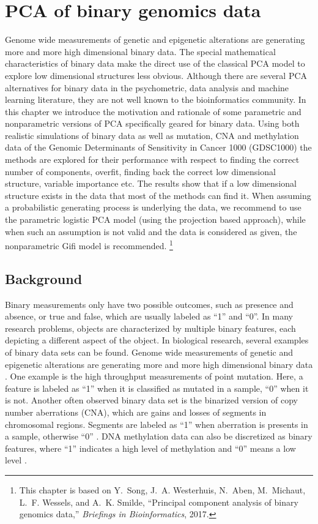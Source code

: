 \chapter{PCA of binary genomics data} \label{chapter:2}
Genome wide measurements of genetic and epigenetic alterations are generating more and more high dimensional binary data. The special mathematical characteristics of binary data make the direct use of the classical PCA model to explore low dimensional structures less obvious. Although there are several PCA alternatives for binary data in the psychometric, data analysis and machine learning literature, they are not well known to the bioinformatics community. In this chapter we introduce the motivation and rationale of some parametric and nonparametric versions of PCA specifically geared for binary data. Using both realistic simulations of binary data as well as mutation, CNA and methylation data of the Genomic Determinants of Sensitivity in Cancer 1000 (GDSC1000) the methods are explored for their performance with respect to finding the correct number of components, overfit, finding back the correct low dimensional structure, variable importance etc. The results show that if a low dimensional structure exists in the data that most of the methods can find it. When assuming a probabilistic generating process is underlying the data, we recommend to use the parametric logistic PCA model (using the projection based approach), while when such an assumption is not valid and the data is considered as given, the nonparametric Gifi model is recommended.
\footnote{This chapter is based on Y.~Song, J.~A. Westerhuis, N.~Aben, M.~Michaut, L.~F. Wessels, and A.~K.
  Smilde, ``Principal component analysis of binary genomics data,'' {\em
  Briefings in Bioinformatics}, 2017.}

\section{Background}
Binary measurements only have two possible outcomes, such as presence and absence, or true and false, which are usually labeled as ``1'' and ``0''. In many research problems, objects are characterized by multiple binary features, each depicting a different aspect of the object. In biological research, several examples of binary data sets can be found. Genome wide measurements of genetic and epigenetic alterations are generating more and more high dimensional binary data \cite{mclendon2008comprehensive, iorio2016landscape}. One example is the high throughput measurements of point mutation. Here, a feature is labeled as ``1'' when it is classified as mutated in a sample, ``0'' when it is not. Another often observed binary data set is the binarized version of copy number aberrations (CNA), which are gains and losses of segments in chromosomal regions. Segments are labeled as ``1'' when aberration is presents in a sample, otherwise ``0'' \cite{wu2014detecting}. DNA methylation data can also be discretized as binary features, where ``1'' indicates a high level of methylation and ``0'' means a low level \cite{iorio2016landscape}.

